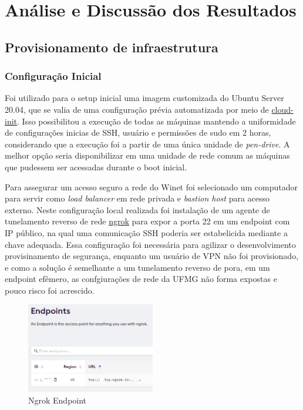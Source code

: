 
\chapter{Análise e Discussão dos Resultados}
\label{chap:provisionamento}

\section{Provisionamento de infraestrutura}

\subsection{Configuração Inicial}

Foi utilizado para o setup inicial uma imagem customizada do Ubuntu Server 20.04, que se valia de uma configuração prévia automatizada por meio de \href{https://cloudinit.readthedocs.io/en/latest/}{cloud-init}. Isso possibilitou a execução de todas as máquinas mantendo a uniformidade de configurações inicias de SSH, usuário e permissões de {sudo} em 2 horas, considerando que a execução foi a partir de uma única unidade de \emph{pen-drive}. A melhor opção seria disponibilizar em uma unidade de rede comum as máquinas que pudessem ser acessadas durante o boot inicial.

Para assegurar um acesso seguro a rede do Winet foi selecionado um computador para servir como \emph{load balancer} em rede privada e \emph{bastion host} para acesso externo. Neste configuração local realizada foi instalação de um agente de tunelamento reverso de rede \href{https://ngrok.io}{ngrok} para expor a porta 22 em um endpoint com IP público, na qual uma comunicação SSH poderia ser estabelicida mediante a chave adequada. Essa configuração foi necessária para agilizar o desenvolvimento provisinamento de segurança, enquanto um usuário de VPN não foi provisionado, e como a solução é semelhante a um tunelamento reverso de pora, em um endpoint efêmero, as confgiurações de rede da UFMG não forma expostas e pouco risco foi acrescido. 


\begin{figure}[!ht]
    \centering
    \includegraphics[width=0.5\textwidth]{04-figuras/ngrok.png}
    \caption{Ngrok Endpoint}
    \label{fig:ngrok}
\end{figure}

